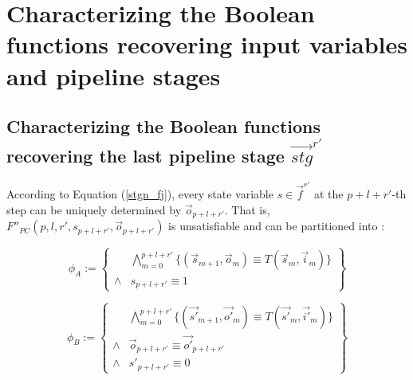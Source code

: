 \documentclass[conference]{IEEEtran}
\begin{document}
% 
% 


\section{Characterizing the Boolean functions recovering input variables and pipeline stages}\label{sec_char}
\subsection{Characterizing the Boolean functions recovering the last pipeline stage $\vec{stg}^{r'}$}

According to Equation (\ref{stgn_fj}),
every state variable $s\in \vec{f}^{r'}$ at the $p+l+r'$-th step can be uniquely determined by $\vec{o}_{p+l+r'}$.
That is,
$F''_{PC}(p,l,r',s_{p+l+r'},\vec{o}_{p+l+r'})$ is unsatisfiable and can be partitioned into :

\begin{equation}
 \phi_A := 
 \left\{
\begin{array}{cc}
&\bigwedge_{m=0}^{p+l+r'}
\{
(\vec{s}_{m+1},\vec{o}_m)\equiv T(\vec{s}_m,\vec{i}_m)
\}
\\
\wedge& s_{p+l+r'}\equiv 1 
\end{array}
\right\}
\end{equation}

\begin{equation}
\phi_B := 
\left\{
\begin{array}{cc}
&\bigwedge_{m=0}^{p+l+r'}
\{
(\vec{s'}_{m+1},\vec{o'}_m)\equiv T(\vec{s'}_m,\vec{i'}_m)
\}
\\
\wedge&\vec{o}_{p+l+r'}\equiv \vec{o'}_{p+l+r'} \\
\wedge& s'_{p+l+r'}\equiv 0 
\end{array}
\right\}
\end{equation}
\end{document}
